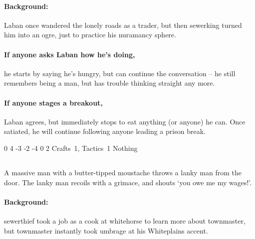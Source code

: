 \begin{multicols}{2}
\paragraph{Background:}
Laban once wandered the lonely roads as a trader, but then \Gls{sewerking} turned him into an ogre, just to practice his nuramancy sphere.

\paragraph{If anyone asks Laban how he's doing,}
he starts by saying he's hungry, but can continue the conversation -- he still remembers being a man, but has trouble thinking straight any more.

\paragraph{If anyone stages a breakout,}
Laban agrees, but immediately stops to eat anything (or anyone) he can.
Once satiated, he will continue following anyone leading a prison break.


  {0}%
  {4}%
  {{-3}%
  {-2}%
  {-4}}%
  {0}%
  {2}%
  {Crafts~1, Tactics~1}%
  {Nothing}%
  {}




\subsection{}
\label{whitehorse}

\begin{boxtext}

  A massive man with a butter-tipped moustache throws a lanky man from the door.
  The lanky man recoils with a grimace, and shouts `you owe me my wages!'.

\end{boxtext}

\paragraph{Background:}
\Gls{sewerthief} took a job as a cook at \gls{whitehorse} to learn more about \gls{townmaster}, but \gls{townmaster} instantly took umbrage at his Whiteplains accent.


\end{multicols}
